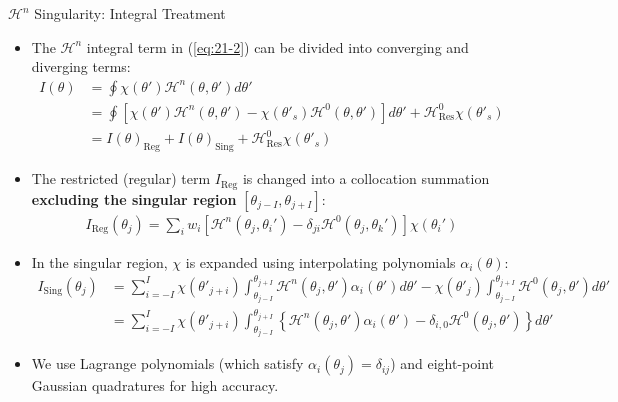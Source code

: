 \documentclass[8pt]{beamer}
\begin{document}
\begin{frame}{\color{white} $\mathcal{H}^n$ Singularity: Integral Treatment}
\begin{itemize}
    \item The $\mathcal{H}^n$ integral term in (\ref{eq:21-2}) can be divided into converging and diverging terms:
    \begin{align}
         I(\theta) &= \oint \chi(\theta') \mathcal{H}^{n}(\theta, \theta') d\theta' \\
         &=\oint [\chi(\theta')\mathcal{H}^{n}(\theta,\theta') - \chi(\theta'_{s})\mathcal{H}^{0}(\theta,\theta')]d\theta' + \mathcal{H}^{0}_{\text{Res}}\chi(\theta'_{s}) \\
         &= I(\theta)_{\text{Reg}} + I(\theta)_{\text{Sing}} + \mathcal{H}^{0}_{\text{Res}}\chi(\theta'_{s}) \label{eq:I_integral}
    \end{align}
    \item The restricted (regular) term $I_{\text{Reg}}$ is changed into a collocation summation \textbf{excluding the singular region} $\left[ \theta_{j-I}, \theta_{j+I} \right]$:
    \begin{align}
         I_{\text{Reg}}(\theta_j) = \sum_i w_i \left[ \mathcal{H}^n(\theta_j, \theta_i') - \delta_{ji} \mathcal{H}^0 (\theta_j, \theta_k') \right] \chi(\theta_i')
    \end{align}
    \item In the singular region, $\chi$ is expanded using interpolating polynomials $\alpha_i(\theta)$:
    \begin{align}
    I_{\text{Sing}}(\theta_{j}) &= \sum_{i=-I}^{I} \chi(\theta'_{j+i}) \int_{\theta_{j-I}}^{\theta_{j+I}} \mathcal{H}^{n}(\theta_{j}, \theta') \alpha_{i}(\theta') d\theta' - \chi(\theta'_{j}) \int_{\theta_{j-I}}^{\theta_{j+I}} \mathcal{H}^{0}(\theta_{j}, \theta') d\theta' \\
    &= \sum_{i=-I}^{I} \chi(\theta'_{j+i}) \int_{\theta_{j-I}}^{\theta_{j+I}} \left\{ \mathcal{H}^{n}(\theta_{j},\theta')\alpha_{i}(\theta') - \delta_{i,0}\mathcal{H}^{0}(\theta_{j},\theta') \right\} d\theta' \label{eq:I_sing}
    \end{align}
    \item We use Lagrange polynomials (which satisfy $\alpha_i(\theta_j) = \delta_{ij}$) and eight-point Gaussian quadratures for high accuracy.
\end{itemize}
\end{frame}
\end{document}
